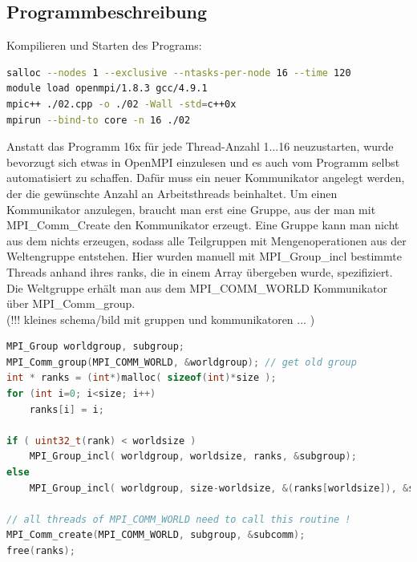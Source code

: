 \documentclass[12pt,a4paper]{article}
\begin{document}
\subsection{Programmbeschreibung}

Kompilieren und Starten des Programs:
\begin{center}\begin{minipage}{0.75\linewidth}\begin{lstlisting}[language=bash]
salloc --nodes 1 --exclusive --ntasks-per-node 16 --time 120
module load openmpi/1.8.3 gcc/4.9.1
mpic++ ./02.cpp -o ./02 -Wall -std=c++0x
mpirun --bind-to core -n 16 ./02
\end{lstlisting}\end{minipage}\end{center}

\label{pg:subcomm}
Anstatt das Programm 16x für jede Thread-Anzahl 1...16 neuzustarten, wurde bevorzugt sich etwas in OpenMPI einzulesen und es auch vom Programm selbst automatisiert zu schaffen. Dafür muss ein neuer Kommunikator angelegt werden, der die gewünschte Anzahl an Arbeitsthreads beinhaltet. Um einen Kommunikator anzulegen, braucht man erst eine Gruppe, aus der man mit MPI\_Comm\_Create den Kommunikator erzeugt. Eine Gruppe kann man nicht aus dem nichts erzeugen, sodass alle Teilgruppen mit Mengenoperationen aus der Weltengruppe entstehen. Hier wurden manuell mit MPI\_Group\_incl bestimmte Threads anhand ihres ranks, die in einem Array übergeben wurde, spezifiziert. Die Weltgruppe erhält man aus dem MPI\_COMM\_WORLD Kommunikator über MPI\_Comm\_group.\\
(!!! kleines schema/bild mit gruppen und kommunikatoren ... )\\

\begin{center}\begin{minipage}{0.75\linewidth}
\begin{lstlisting}[language=C++,firstnumber=242, caption={Erstellen eines Teilkommunikators um nur einen Teil der gesamt verfügbaren Threads rechnen zu lassen}, label=lst:subcomm]
MPI_Group worldgroup, subgroup;
MPI_Comm_group(MPI_COMM_WORLD, &worldgroup); // get old group
int * ranks = (int*)malloc( sizeof(int)*size );
for (int i=0; i<size; i++)
    ranks[i] = i;

if ( uint32_t(rank) < worldsize )
    MPI_Group_incl( worldgroup, worldsize, ranks, &subgroup);
else
    MPI_Group_incl( worldgroup, size-worldsize, &(ranks[worldsize]), &subgroup);

// all threads of MPI_COMM_WORLD need to call this routine !
MPI_Comm_create(MPI_COMM_WORLD, subgroup, &subcomm);
free(ranks);
\end{lstlisting}\end{minipage}\end{center}
\end{document}
